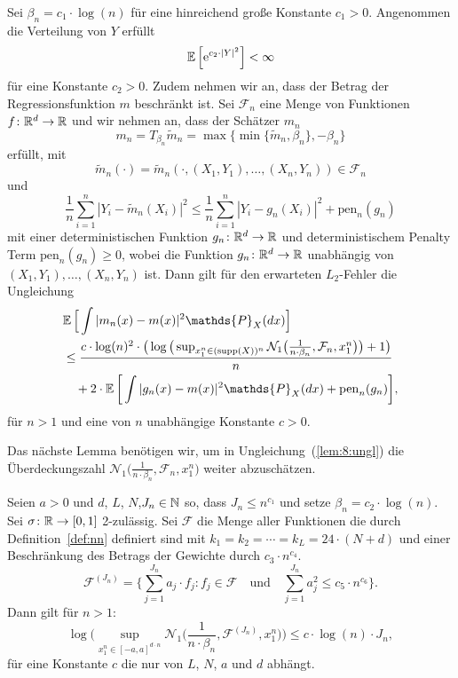 {  \begin{lem}
  \label{lem:8}
Sei $\beta_n = c_1 \cdot \log(n)$ für eine hinreichend große Konstante $c_1 > 0$. Angenommen die Verteilung von $Y$ erfüllt 
$$ \mathbb{E}\,\Big[\mathrm{e}^{c_2 \cdot |Y|^2}\Big] < \infty$$
für eine Konstante $c_2 > 0.$ Zudem nehmen wir an, dass der Betrag der Regressionsfunktion $m$ beschränkt ist. Sei $\mathcal{F}_n$ eine Menge von Funktionen $f\colon \mathbb{R}^d \to \mathbb{R}$ und wir nehmen an, dass der Schätzer $m_n$ 
$$m_n = T_{\beta_n}\tilde{m}_n = \max\{\min\{\tilde{m}_n, \beta_n\}, -\beta_n\}$$ 
erfüllt, mit 
$$\tilde{m}_n(\cdot) = \tilde{m}_n(\cdot,(X_1, Y_1),\dots,(X_n, Y_n)) \in \mathcal{F}_n$$
und 
$$\frac{1}{n} \sum_{i = 1}^n |Y_i - \tilde{m}_n(X_i)|^2 \leq \frac{1}{n}\sum_{i = 1}^n |Y_i - g_{n}(X_i)|^2 + \mathrm{pen}_n(g_n)$$
mit einer deterministischen Funktion $g_{n}\colon \mathbb{R}^d \to \mathbb{R}$ und deterministischem Penalty Term $\mathrm{pen}_n(g_{n}) \geq 0$, wobei die Funktion $g_{n}\colon \mathbb{R}^d \to \mathbb{R}$ unabhängig von $(X_1, Y_1),\dots,(X_n,Y_n)$ ist.
Dann gilt für den erwarteten $L_2$-Fehler die Ungleichung
\begin{equation}
\label{lem:8:ungl}
\begin{split}
& \E \Big[\int |m_n(x) - m(x)|^2 \mathds{P}_X(dx)\Big] \\
& \leq \frac{c \cdot \log(n)^2 \cdot \big(\log\big(\sup_{x_1^n \in (\supp(X))^n}\mathcal{N}_1\big(\frac{1}{n \cdot \beta_n},\mathcal{F}_n,x_1^n\big)\big) + 1\big)}{n} \\
& \quad + 2 \cdot \E\bigg[\int |g_{n}(x) - m(x)|^2 \mathds{P}_X(dx) + \mathrm{pen}_n(g_{n})\bigg],
\end{split}
\end{equation}
für $n > 1$ und eine von $n$ unabhängige Konstante $c > 0$.
  \end{lem}
Das nächste Lemma benötigen wir, um in Ungleichung~(\ref{lem:8:ungl}) die Überdeckungszahl $\mathcal{N}_1\big(\frac{1}{n \cdot \beta_n},\mathcal{F}_n,x_1^n\big)$ weiter abzuschätzen.
\begin{lem}
\label{lem:9}
Seien $a > 0$ und $d$, $L$, $N$,$ J_n \in \mathbb{N}$ so, dass $J_n \leq n^{c_{1}}$ und setze $\beta_n = c_2 \cdot \log(n).$
Sei $\sigma\colon \mathbb{R} \to [0, 1]$ 2-zulässig. Sei $\mathcal{F}$ die Menge aller Funktionen die durch Definition~\ref{def:nn} definiert sind mit $k_1 = k_2 = \cdots = k_L = 24 \cdot (N + d)$ und einer Beschränkung des Betrags der Gewichte durch $c_{3} \cdot n^{c_{4}}$.
$$ \mathcal{F}^{(J_n)} = \biggl\{\sum_{j = 1}^{J_n} a_j \cdot f_j : f_j \in \mathcal{F} \quad \text{und} \quad \sum_{j = 1}^{J_n} a_j^2 \leq c_{5} \cdot n^{c_{6}}\biggr\}.$$
Dann gilt für $n > 1:$
$$\log\bigg(\sup_{x_1^n\in[-a,a]^{d \cdot n}} \mathcal{N}_1\bigg(\frac{1}{n \cdot \beta_n}, \mathcal{F}^{(J_n)},x_1^n\bigg)\bigg) \leq c \cdot \log(n) \cdot J_n,$$
für eine Konstante $c$ die nur von $L$, $N$, $a$ und $d$ abhängt.
\end{lem}

}

